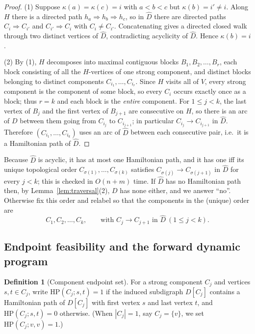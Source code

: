 \documentclass[12pt]{article}
\theoremstyle{definition}
\newtheorem{definition}{Definition}
\newcommand{\Vv}{V}
\begin{document}
\begin{proof}
(1) Suppose $\kappa(a)=\kappa(c)=i$ with $a<b<c$ but $\kappa(b)=i'\neq i$. Along
$H$ there is a directed path $h_{a}\Rightarrow h_{b}\Rightarrow h_{c}$, so in
$\widehat D$ there are directed paths $C_{i}\Rightarrow C_{i'}$ and
$C_{i'}\Rightarrow C_{i}$ with $C_{i}\neq C_{i'}$. Concatenating gives a directed
closed walk through two distinct vertices of $\widehat D$, contradicting acyclicity
of $\widehat D$. Hence $\kappa(b)=i$.

(2) By (1), $H$ decomposes into maximal contiguous blocks $B_{1},B_{2},\dots,B_{r}$,
each block consisting of all the $H$-vertices of one strong component, and distinct
blocks belonging to distinct components $C_{i_{1}},\dots,C_{i_{r}}$. Since $H$
visits all of $\Vv$, every strong component is the component of some block, so
every $C_{i}$ occurs exactly once as a block; thus $r=k$ and each block is the
\emph{entire} component. For $1\le j<k$, the last vertex of $B_{j}$ and the first
vertex of $B_{j+1}$ are consecutive on $H$, so there is an arc of $D$ between them
going from $C_{i_{j}}$ to $C_{i_{j+1}}$; in particular $C_{i_{j}}\to C_{i_{j+1}}$ in
$\widehat D$. Therefore $(C_{i_{1}},\dots,C_{i_{k}})$ uses an arc of $\widehat D$
between each consecutive pair, i.e.\ it is a Hamiltonian path of $\widehat D$.
\end{proof}

Because $\widehat D$ is acyclic, it has at most one Hamiltonian path, and it has
one iff its unique topological order $C_{\sigma(1)},\dots,C_{\sigma(k)}$ satisfies
$C_{\sigma(j)}\to C_{\sigma(j+1)}$ in $\widehat D$ for every $j<k$; this is checked
in $O(n+m)$ time. If $\widehat D$ has no Hamiltonian path then, by
Lemma~\ref{lem:traversal}(2), $D$ has none either, and we answer ``no''. Otherwise
fix this order and relabel so that the components in the (unique) order are
\[
C_{1},C_{2},\dots,C_{k},\qquad\text{with }C_{j}\to C_{j+1}\text{ in }\widehat D\ (1\le j<k).
\]

\subsection{Endpoint feasibility and the forward dynamic program}

\begin{definition}[Component endpoint set]\label{def:HP}
For a strong component $C_{j}$ and vertices $s,t\in C_{j}$, write
$\mathrm{HP}(C_{j};s,t)=1$ if the induced subdigraph $D[C_{j}]$ contains a
Hamiltonian path of $D[C_{j}]$ with first vertex $s$ and last vertex $t$, and
$\mathrm{HP}(C_{j};s,t)=0$ otherwise. (When $|C_{j}|=1$, say $C_{j}=\{v\}$, we set
$\mathrm{HP}(C_{j};v,v)=1$.)
\end{definition}
\end{document}
